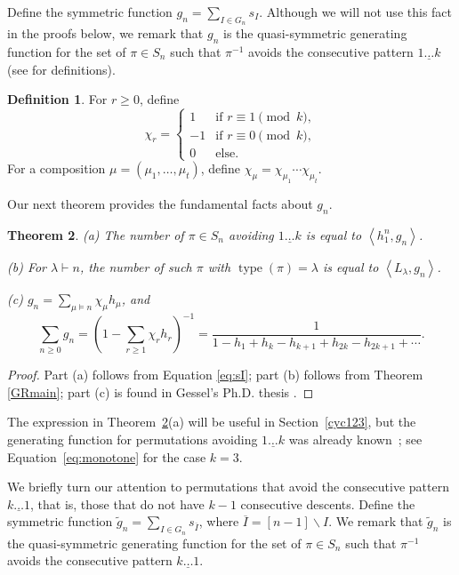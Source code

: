 \documentclass[12pt]{article}
\newcommand{\Perm}{S}
\DeclareMathOperator{\type}{type}
\newcommand{\ee}{\chi}
\newtheorem{thm}{Theorem}[section]
\theoremstyle{definition}
\newtheorem{defn}[thm]{Definition}
\begin{document}
Define the symmetric function $g_n = \sum_{I \in G_n} s_{I}$.
Although we will not use this fact in the proofs below, we remark that $g_n$ is the quasi-symmetric generating function for the set of $\pi \in \Perm_n$ such that $\pi^{-1}$ avoids the consecutive pattern $\underline{1\dots k}$ (see \cite[Sec.\ 3,4]{GR} for definitions).

\begin{defn} \label{defee} For $r \ge 0$, define
\[ \ee_r = \begin{cases} 1 & \text{if $r \equiv 1 \pmod{k}$}, \\
-1 & \text{if $r \equiv 0 \pmod{k}$}, \\
0 & \text{else}. \end{cases} \]
For a composition $\mu = (\mu_1, \ldots, \mu_t)$, define $\ee_\mu = \ee_{\mu_1} \cdots \ee_{\mu_t}$.
\end{defn}

Our next theorem provides the fundamental facts about $g_n$.

\begin{thm} \label{symmetricfunction}
(a) The number of $\pi \in \Perm_n$ avoiding $\underline{1\dots k}$ is equal to $\left\langle h_1^n, g_n \right\rangle$.

(b) For $\lambda \vdash n$, the number of such $\pi$ with $\type(\pi) = \lambda$ is equal to $\left\langle L_\lambda, g_n \right\rangle$.

(c) $g_n = \sum_{\mu \vDash n} \ee_\mu h_\mu$, and
\[ \sum_{n\ge0} g_n = \left(1 - \sum_{r\ge1} \ee_r h_r\right)^{-1} = \frac{1}{1 - h_1 + h_k - h_{k+1} + h_{2k} - h_{2k+1} + \cdots}. \]
\end{thm}

\begin{proof}
Part (a) follows from Equation \eqref{eq:sI}; part (b) follows from Theorem \ref{GRmain}; part (c) is found in Gessel's Ph.D. thesis \cite[Sec.\ 5.2, Example 3]{GesselThesis}.
\end{proof}

The expression in Theorem~\ref{symmetricfunction}(a) will be useful in Section~\ref{cyc123}, but the generating function for 
permutations avoiding $\underline{1\dots k}$ was already known~\cite{DB,EliNoy}; see Equation~\eqref{eq:monotone} for the case $k=3$.

We briefly turn our attention to permutations that avoid the consecutive pattern $\underline{k\dots 1}$, that is, those that do not have $k-1$ consecutive descents. Define the symmetric function $\widetilde{g}_n = \sum_{I \in G_n} s_{\overline{I}}$, where $\overline{I} = [n-1] \smallsetminus I$. We remark that $\widetilde{g}_n$ is the quasi-symmetric generating function for the set of $\pi \in \Perm_n$ such that $\pi^{-1}$ avoids the consecutive pattern $\underline{k\dots 1}$.
\end{document}

